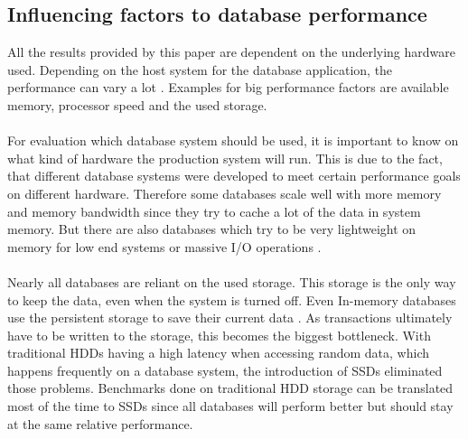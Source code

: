 \subsection{Influencing factors to database performance}
All the results provided by this paper are dependent on the underlying hardware used. Depending on the host system for the database application, the performance can vary a lot \cite{Lee_W._2009}. Examples for big performance factors are available memory, processor speed and the used storage.
\\\\
For evaluation which database system should be used, it is important to know on what kind of hardware the production system will run. This is due to the fact, that different database systems were developed to meet certain performance goals on different hardware. Therefore some databases scale well with more memory and memory bandwidth since they try to cache a lot of the data in system memory. But there are also databases which try to be very lightweight on memory for low end systems or massive I/O  operations \cite{Boncz_Database_1999}.
\\\\
Nearly all databases are reliant on the used storage. This storage is the only way to keep the data, even when the system is turned off. Even In-memory databases use the persistent storage to save their current data \cite{Wang_Main_2001}. As transactions ultimately have to be written to the storage, this becomes the biggest bottleneck. With traditional HDDs having a high latency when accessing random data, which happens frequently on a database system, the introduction of SSDs  eliminated those problems. Benchmarks done on traditional HDD storage can be translated most of the time to SSDs since all databases will perform better but should stay at the same relative performance.
